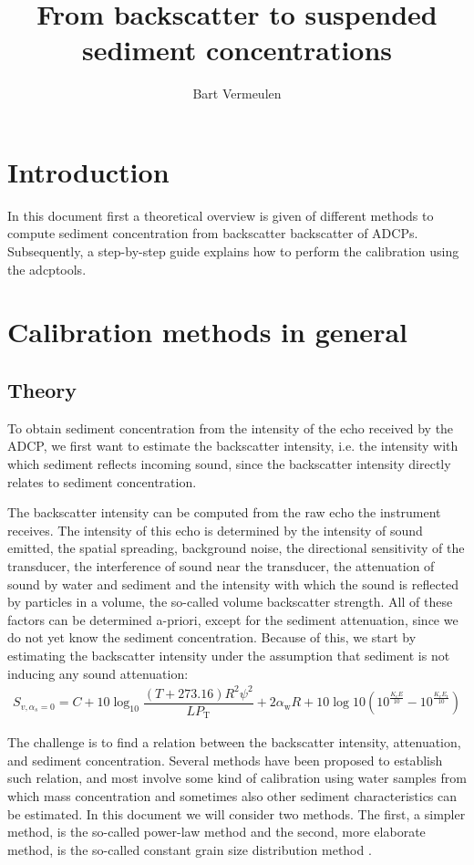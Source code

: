 \documentclass[]{article}
\title{From backscatter to suspended sediment concentrations}
\author{Bart Vermeulen}
\begin{document}
\maketitle
\tableofcontents
\section{Introduction}
In this document first a theoretical overview is given of different methods to compute sediment concentration from backscatter backscatter of ADCPs. Subsequently, a step-by-step guide explains how to perform the calibration using the adcptools.

\section{Calibration methods in general}
\subsection{Theory}
\label{sec:general_theory}
To obtain sediment concentration from the intensity of the echo received by the ADCP, we first want to estimate the backscatter intensity, i.e. the intensity with which sediment reflects incoming sound, since the backscatter intensity directly relates to sediment concentration. 

The backscatter intensity can be computed from the raw echo the instrument receives. The intensity of this echo is determined by the intensity of sound emitted, the spatial spreading, background noise, the directional sensitivity of the transducer, the interference of sound near the transducer, the attenuation of sound by water and sediment and the intensity with which the sound is reflected by particles in a volume, the so-called volume backscatter strength.  All of these factors can be determined a-priori, except for the sediment attenuation, since we do not yet know the sediment concentration. Because of this, we start by estimating the backscatter intensity under the assumption that sediment is not inducing any sound attenuation:
\begin{align}
  S_{v,\alpha_s=0}= C + 10\log_{10}\dfrac{(T+273.16)R^2 \psi^2}{LP_\text{T}}  + 2\alpha_\text{w}R + 10\log10\left(10^{\frac{K_\text{c}E}{10}}-10^{\frac{K_\text{c}E_\text{r}}{10}}\right)
\end{align}

The challenge is to find a relation between the backscatter intensity, attenuation, and sediment concentration. Several methods have been proposed to establish such relation, and most involve some kind of calibration using water samples from which mass concentration and sometimes also other sediment characteristics can be estimated.
In this document we will consider two methods. The first, a simpler method, is the so-called power-law method \citep{hoitink2005} and the second, more elaborate method, is the so-called constant grain size distribution method \citep{sassi2012}.
\end{document}
